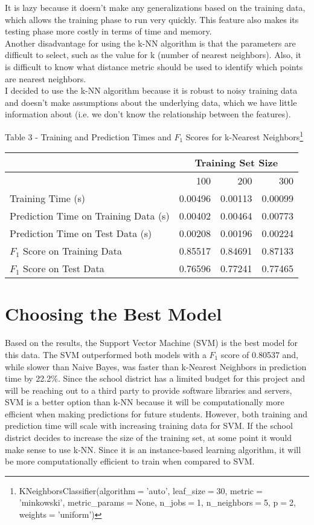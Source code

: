 \documentclass[11pt]{article}
\begin{document}
It is lazy because it doesn’t make any generalizations based on the training data, which allows the training phase to run very quickly. This feature also makes its testing phase more costly in terms of time and memory.\\

Another disadvantage for using the k-NN algorithm is that the parameters are difficult to select, such as the value for k (number of nearest neighbors). Also, it is difficult to know what distance metric should be used to identify which points are nearest neighbors.\\

I decided to use the k-NN algorithm because it is robust to noisy training data and doesn’t make assumptions about the underlying data, which we have little information about (i.e. we don’t know the relationship between the features).\\

\begin{center} Table 3 - Training and Prediction Times and $F_1$ Scores for k-Nearest Neighbors\footnote{KNeighborsClassifier(algorithm$=$'auto', leaf\_size$=$30, metric$=$'minkowski', metric\_params$=$None, n\_jobs$=$1, n\_neighbors$=$5, p$=$2, weights$=$'uniform')} 
\end{center}
\begin{tabular}{ l r r r }
  & \multicolumn{3}{c}{Training Set Size} \\
  \hline
  & 100 & 200 & 300\\
  \hline
  Training Time (s) & 0.00496 & 0.00113 & 0.00099 \\
  Prediction Time on Training Data (s) & 0.00402 & 0.00464 & 0.00773 \\
  Prediction Time on Test Data (s) & 0.00208 & 0.00196 &  0.00224\\
  $F_1$ Score on Training Data & 0.85517 & 0.84691 & 0.87133\\
  $F_1$ Score on Test Data & 0.76596 & 0.77241 & 0.77465 \\
\end{tabular}

\section{Choosing the Best Model}
Based on the results, the Support Vector Machine (SVM) is the best model for this data. The SVM outperformed both models with a $F_1$ score of 0.80537 and, while slower than Naive Bayes, was faster than k-Nearest Neighbors in prediction time by 22.2\%. Since the school district has a limited budget for this project and will be reaching out to a third party to provide software libraries and servers, SVM is a better option than k-NN because it will be computationally more efficient when making predictions for future students. However, both training and prediction time will scale with increasing training data for SVM. If the school district decides to increase the size of the training set, at some point it would make sense to use k-NN. Since it is an instance-based learning algorithm, it will be more computationally efficient to train when compared to SVM. \\ 
\end{document}
